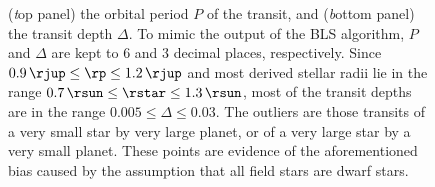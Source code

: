 \begin{figure}
\begin{center}
{({\textit top panel}) the orbital period $P$ of the transit, and %
({\textit bottom panel}) the transit depth $\Delta$.
To mimic the output of the BLS algorithm, $P$ and $\Delta$ are kept to 6 and 3 decimal places, respectively.
Since \mbox{$0.9\,\rjup \leq \rp \leq 1.2\,\rjup$} and most derived stellar radii lie in the range \mbox{$0.7\,\rsun \leq \rstar \leq 1.3\,\rsun$}, most of the transit depths are in the range \mbox{$0.005 \leq \Delta \leq 0.03$}.
The outliers are those transits of a very small star by very large planet, or of a very large star by a very small planet.
These points are evidence of the aforementioned bias caused by the assumption that all field stars are dwarf stars. %
}\label{cha:human:sec:model:fig:bls1}
\end{center}
\end{figure}

